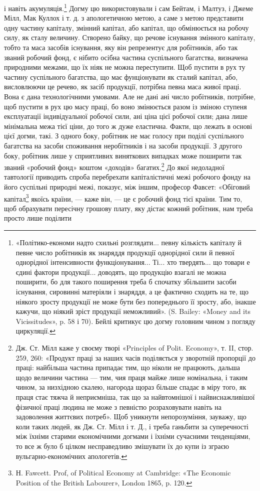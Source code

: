 і навіть акумуляція.\footnote{
«Політико-економи надто схильні розглядати... певну кількість
капіталу й певне число робітників як знаряддя продукції однорідної
сили й певної однорідної інтенсивности функціонування... Ті... хто твердять...
що товари е єдині фактори продукції... доводять, що продукцію
взагалі не можна поширити, бо для такого поширення треба б спочатку
збільшити засоби існування, сировинні матеріяли і знаряддя, а це фактично
сходить на те, що ніякого зросту продукції не може бути без попереднього
її зросту, або, інакше кажучи, що ніякий зріст продукції неможливий».
(S. Bailey: «Money and its Vicissitudes», p. 58 і 70). Бейлі
критикує цю догму головним чином з погляду циркуляції.
} Догму цю використовували і сам Бейтам,
і Малтуз, і Джеме Мілл, Мак Куллох і т. д. з апологетичною
метою, а саме з метою представити одну частину капіталу, змінний
капітал, або капітал, що обмінюється на робочу силу, як
сталу величину. Створено байку, що речове існування змінного
капіталу, тобто та маса засобів існування, яку він репрезентує
для робітників, або так званий робочий фонд, є нібито осібна
частина суспільного багатства, визначена природними межами,
що їх ніяк не можна переступити. Щоб пустити в рух ту частину
суспільного багатства, що має фунціонувати як сталий капітал,
або, висловлюючи це речево, як засіб продукції, потрібна
певна маса живої праці. Вона є дана технологічними умовами. Але
не дані ані число робітників, потрібне, щоб пустити в рух цю
масу праці, бо воно змінюється разом із зміною ступеня експлуатації
індивідуальної робочої сили, ані ціна цієї робочої сили;
дана лише мінімальна межа тієї ціни, до того ж дуже еластична.
Факти, що лежать в основі цієї догми, такі. З одного боку, робітник
не має голосу при поділі суспільного багатства на засоби
споживання неробітників і на засоби продукції. З другого
боку, робітник лише у сприятливих виняткових випадках може
поширити так званий «робочий фонд» коштом «доходів» багатих.\footnote{
Дж. Ст. Мілл каже у своєму творі «Principles of Polit. Economy»,
т. II, стор. 259, 260: «Продукт праці за наших часів поділяється у зворотній
пропорції до праці: найбільша частина припадає тим, що ніколи
не працюють, дальша щодо величини частина — тим, чия праця майже
лише номінальна, і таким чином, за низхідною скалею, нагорода щораз
більше спадає в міру того, як праця стає тяжча й неприємніша, так що
за найвтомнішої і найвиснажливішої фізичної праці людина не може з
певністю розраховувати навіть на задоволення життєвих потреб». Щоб
уникнути непорозуміння, зауважу, що коли таких людей, як Дж. Ст.
Мілл і т. Д., і треба ганьбити за суперечності між їхніми старими економічними
догмами і їхніми сучасними тенденціями, то все ж було б цілком
несправедливо змішувати їх до купи із зграєю вульгарно-економічних
апологетів.
}
До якої недоладної тавтології приводить спроба перебрехати
капіталістичні межі робочого фонду на його суспільні
природні межі, показує, між іншим, професор Фавсет: «Обіговий
капітал\footnote{
Н. Fawcett. Prof, of Political Economy at Cambridge: «The Economic
Position of the British Labourer», London 1865, p. 120.
} якоїсь країни, — каже він, — це є робочий фонд
тієї країни. Тим то, щоб обрахувати пересічну грошову плату,
яку дістає кожний робітник, нам треба просто лише поділити